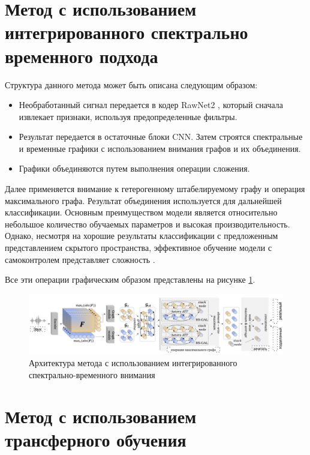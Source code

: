 \section{Метод с использованием интегрированного спектрально временного подхода}

Структура данного метода может быть описана следующим образом:

\begin{itemize}
    \item Необработанный сигнал передается в кодер RawNet2 \cite{jung2019rawnet}, который сначала извлекает признаки, используя предопределенные фильтры.
    \item Результат передается в остаточные блоки CNN. Затем строятся спектральные и временные графики с использованием внимания графов и их объединения.
    \item Графики объединяются путем выполнения операции сложения.
\end{itemize}

Далее применяется внимание к гетерогенному штабелируемому графу и операция максимального графа. Результат объединения используется для дальнейшей классификации. Основным преимуществом модели является относительно небольшое количество обучаемых параметров и высокая производительность. Однако, несмотря на хорошие результаты классификации с предложенным представлением скрытого пространства, эффективное обучение модели с самоконтролем представляет сложность \cite{jung2021aasist}.

Все эти операции графическим образом представлены на рисунке \ref{fig:cnn-arch}.

\begin{figure}[H]
	\centering
	\includegraphics[width=1\linewidth]{images/gat-arch.png}
	\caption{Архитектура метода с использованием интегрированного спектрально-временного внимания}
	\label{fig:cnn-arch}
\end{figure}

\section{Метод с использованием трансферного обучения}

